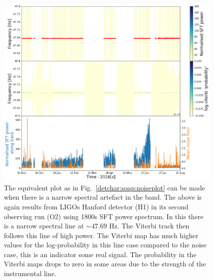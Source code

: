 \begin{figure}
	\centering
	\includegraphics[width=\textwidth]{C5_detchar/track_F47_6_47_8_linenarrow.png}
	\caption{The equivalent plot as in Fig.~\ref{detchar:soap:noiseplot} can be made when there is a narrow spectral artefact in the band. The above is again results from \acp{LIGO} Hanford detector (H1) in its second observing run (O2) using 1800s \ac{SFT} power spectrum. In this there is a narrow spectral line at $\sim 47.69$ Hz. The Viterbi track then follows this line of high power. The Viterbi map has much higher values for the log-probability in this line case compared to the noise case, this is an indicator some real signal. The probability in the Viterbi maps drops to zero in some areas due to the strength of the instrumental line. }
	\label{detchar:soap:lineplot}
\end{figure}

